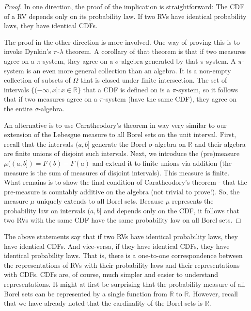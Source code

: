 \documentclass{book}
\theoremstyle{plain}%
\theoremstyle{definition}
\begin{document}
\begin{proof}
In one direction, the proof of the implication is straightforward: The CDF of a RV depends only on its probability law. If two RVs have identical probability laws, they have identical CDFs.

The proof in the other direction is more involved. One way of proving this is to invoke Dynkin's $\pi$-$\lambda$ theorem. A corollary of that theorem is that if two measures agree on a $\pi$-system, they agree on a $\sigma$-algebra generated by that $\pi$-system. A $\pi$-system is an even more general collection than an algebra. It is a non-empty collection of subsets of $\Omega$ that is closed under finite intersection. The set of intervals $\{(-\infty, x]: x\in \mathbb{R} \}$ that a CDF is defined on is a $\pi$-system, so it follows that if two measures agree on a $\pi$-system (have the same CDF), they agree on the entire $\sigma$-algebra.

An alternative is to use Caratheodory's theorem in way very similar to our extension of the Lebesgue measure to all Borel sets on the unit interval. First, recall that the intervals $(a, b]$ generate the Borel $\sigma$-algebra on $\mathbb{R}$ and their algebra are finite unions of disjoint such intervals. Next, we introduce the (pre)measure $\mu((a,b]) = F(b) - F(a)$ and extend it to finite unions via addition (the measure is the sum of measures of disjoint intervals). This measure is finite. What remains is to show the final condition of Caratheodory's theorem - that the pre-measure is countably additive on the algebra (not trivial to prove!). So, the measure $\mu$ uniquely extends to all Borel sets. Because $\mu$ represents the probability law on intervals $(a, b]$ and depends only on the CDF, it follows that two RVs with the same CDF have the same probability law on all Borel sets.
\end{proof}

The above statements say that if two RVs have identical probability laws, they have identical CDFs. And vice-versa, if they have identical CDFs, they have identical probability laws. That is, there is a one-to-one correspondence between the representations of RVs with their probability laws and their representations with CDFs. CDFs are, of course, much simpler and easier to understand representations. It might at first be surprising that the probability measure of all Borel sets can be represented by a single function from $\mathbb{R}$ to $\mathbb{R}$. However, recall that we have already noted that the cardinality of the Borel sets is $\mathbb{R}$.
\end{document}
